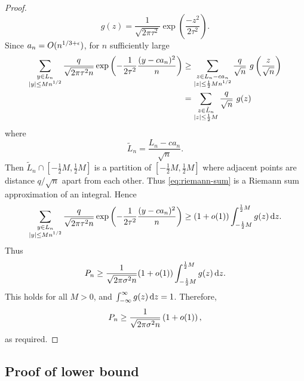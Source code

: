 \begin{proof}
\begin{equation*}
        g(z) = \frac{1}{\sqrt{2 \pi \tau^2}} \exp\left( \frac{-z^2}{2 \tau^2} \right).
    \end{equation*}
    Since $a_n = O(n^{1/3 + \epsilon})$, for $n$ sufficiently large
    \begin{align}
        \sum_{\substack{y \in L_n \\ \lvert y\rvert \leq M n^{1/2}}}
        \frac{q}{\sqrt{2 \pi \tau^2 n}} \exp \left( - \frac{1}{2 \tau^2} \frac{(y - ca_n)^2}{n} \right)
        &\geq \sum_{\substack{z \in L_n - ca_n\\ \lvert z\rvert \leq \frac{1}{2} M n^{1/2}}} 
        \frac{q}{\sqrt{n}}\ g \left( \frac{z}{\sqrt{n}} \right) \\
        &= \sum_{\substack{z \in \tilde{L}_n \\ \lvert z\rvert \leq \frac{1}{2} M }}
        \frac{q}{\sqrt{n}}\ g(z) \label{eq:riemann-sum}
    \end{align}
    where
    \begin{equation*}
        \tilde{L}_n = \frac{L_n - ca_n}{\sqrt{n}}.
    \end{equation*}
    Then $\tilde{L}_n \cap [-\frac{1}{2}M, \frac{1}{2}M]$ is a partition of $[-\frac{1}{2}M, \frac{1}{2}M]$ where adjacent points are distance $q/\sqrt{n}$ apart from each other. Thus \cref{eq:riemann-sum} is a Riemann sum approximation of an integral. Hence
    \begin{equation*}
        \sum_{\substack{y \in L_n \\ \lvert y\rvert \leq M n^{1/2}}}
        \frac{q}{\sqrt{2 \pi \tau^2 n}} \exp \left( - \frac{1}{2 \tau^2} \frac{(y - ca_n)^2}{n} \right)
        \geq (1 + o(1)) \int_{-\frac{1}{2} M}^{\frac{1}{2}M} g(z) \mathop{}\!\mathrm{d} z.
    \end{equation*}
    Thus
    \begin{equation*}
        P_n \geq \frac{1}{\sqrt{2 \pi \sigma^2 n}} (1 + o(1)) \int_{-\frac{1}{2} M}^{\frac{1}{2}M} g(z) \mathop{}\!\mathrm{d} z.
    \end{equation*}
    This holds for all $M > 0$, and $\int_{-\infty}^{\infty} g(z) \mathop{}\!\mathrm{d} z = 1$. Therefore,
    \begin{equation*}
        P_n \geq \frac{1}{\sqrt{2 \pi \sigma^2 n}} \left( 1 + o(1) \right),
    \end{equation*}
    as required.
\end{proof}

\subsection{Proof of lower bound}

